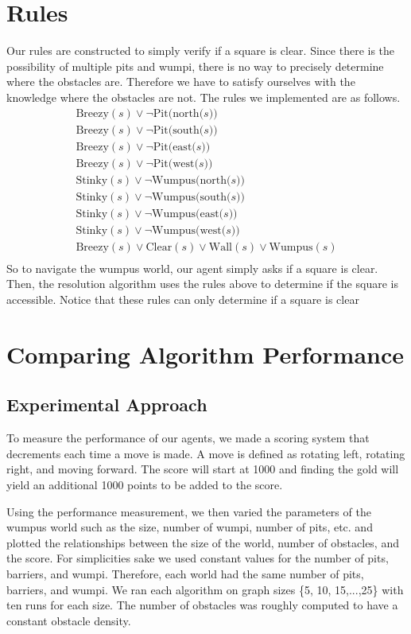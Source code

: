 \documentclass{article}
\begin{document}
\section{Rules}

Our rules are constructed to simply verify if a square is clear. Since there is the possibility of multiple pits and wumpi, there is no way to precisely determine where the obstacles are. Therefore we have to satisfy ourselves with the knowledge where the obstacles are not. The rules we implemented are as follows.
\begin{gather*}
\text{Breezy}(s) \lor \neg \text{Pit(north($s$))} \\
\text{Breezy}(s) \lor \neg \text{Pit(south($s$))} \\
\text{Breezy}(s) \lor \neg \text{Pit(east($s$))} \\
\text{Breezy}(s) \lor \neg \text{Pit(west($s$))} \\
\text{Stinky}(s) \lor \neg \text{Wumpus(north($s$))} \\
\text{Stinky}(s) \lor \neg \text{Wumpus(south($s$))} \\
\text{Stinky}(s) \lor \neg \text{Wumpus(east($s$))} \\
\text{Stinky}(s) \lor \neg \text{Wumpus(west($s$))} \\
\text{Breezy}(s) \lor \text{Clear}(s) \lor \text{Wall}(s) \lor \text{Wumpus}(s)\\
\end{gather*}
So to navigate the wumpus world, our agent simply asks if a square is clear. Then, the resolution algorithm uses the rules above to determine if the square is accessible. Notice that these rules can only determine if a square is clear

\section{Comparing Algorithm Performance}
	\label{comparisons}
	
	\subsection{Experimental Approach}
	To measure the performance of our agents, we made a scoring system that decrements each time a move is made.
	 A move is defined as rotating left, rotating right, and moving forward.
	  The score will start at 1000 and finding the gold will yield an additional 1000 points to be added to the score.
	
	Using the performance measurement, we then varied the parameters of the wumpus world such as the size, number of wumpi, number of pits, etc. and plotted the relationships between the size of the world, number of obstacles, and the score.
	 For simplicities sake we used constant values for the number of pits, barriers, and wumpi.
	  Therefore, each world had the same number of pits, barriers, and wumpi. 
	  We ran each algorithm on graph sizes \{5, 10, 15,...,25\} with ten runs for each size.
	  The number of obstacles was roughly computed to have a constant obstacle density.
	
\end{document}
